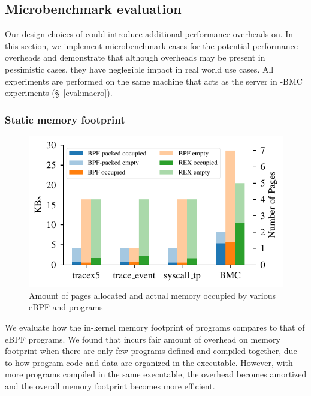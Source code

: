 \subsection{Microbenchmark evaluation}
Our design choices of \projname{} could introduce additional performance
    overheads on.
In this section, we implement microbenchmark cases for the potential
    performance overheads and demonstrate that although overheads may be
    present in pessimistic cases, they have neglegible impact in real world use
    cases.
All experiments are performed on the same machine that acts as the server in
    \projname{}-BMC experiments (\S~\ref{eval:macro}).

\subsubsection{Static memory footprint}
\begin{figure}[t]
    \includegraphics[width=1.0\linewidth]{figs/mem.pdf}
    \centering
    \vspace{-25pt}
    \caption{Amount of pages allocated and actual memory occupied by various
        eBPF and \projname{} programs}
    \label{fig:eval-mem-footprint}
    \vspace{-10pt}
\end{figure}
We evaluate how the in-kernel memory footprint of \projname{} programs
    compares to that of eBPF programs.
We found that \projname{} incurs fair amount of overhead on memory footprint
    when there are only few programs defined and compiled together, due to how
    program code and data are organized in the executable.
However, with more programs compiled in the same executable, the overhead
    becomes amortized and the overall memory footprint becomes more efficient.

